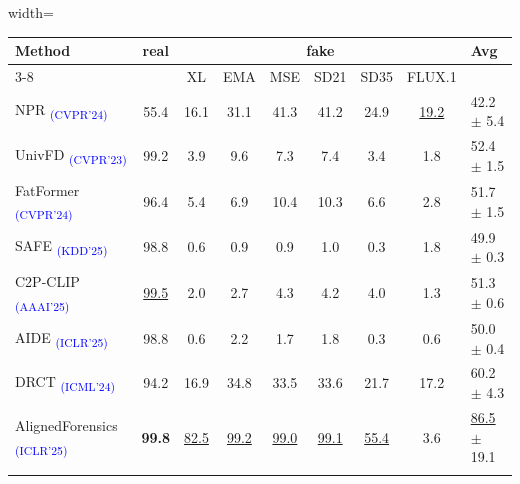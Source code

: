 \documentclass{article}
\begin{document}
\begin{table}[tb!]
  \centering
\begin{minipage}[t]{0.51\textwidth}
    \centering
    \label{tab:compare-DDA-coco}
    \begin{adjustbox}{width=\linewidth}
    \begin{tabular}{lc|cccccc|l}
    \toprule
    \multirow{2}{*}{Method} & \multirow{2}{*}{real} & \multicolumn{6}{|c|}{fake} & \multirow{2}{*}{Avg} \\
    \cmidrule{3-8}
 &  & XL & EMA & MSE & SD21 & SD35 & FLUX.1 & \\
    \midrule
NPR \textsubscript{\textcolor{blue}{(CVPR'24)}} \cite{cozzolino2024zero} & 55.4 & 16.1 & 31.1 & 41.3 & 41.2 & 24.9 & \underline{19.2} & 42.2 $\pm$ 5.4 \\
UnivFD \textsubscript{\textcolor{blue}{(CVPR'23)}} \cite{ojha2023towards} & 99.2 & 3.9 & 9.6 & 7.3 & 7.4 & 3.4 & 1.8 & 52.4 $\pm$ 1.5 \\
FatFormer \textsubscript{\textcolor{blue}{(CVPR'24)}} \cite{liu2024forgery} & 96.4 & 5.4 & 6.9 & 10.4 & 10.3 & 6.6 & 2.8 & 51.7 $\pm$ 1.5 \\
SAFE \textsubscript{\textcolor{blue}{(KDD'25)}} \cite{li2024improving} & 98.8 & 0.6 & 0.9 & 0.9 & 1.0 & 0.3 & 1.8 & 49.9 $\pm$ 0.3 \\
C2P-CLIP \textsubscript{\textcolor{blue}{(AAAI'25)}} \cite{tan2024c2p} & \underline{99.5} & 2.0 & 2.7 & 4.3 & 4.2 & 4.0 & 1.3 & 51.3 $\pm$ 0.6 \\
AIDE \textsubscript{\textcolor{blue}{(ICLR'25)}} \cite{yan2024sanity} & 98.8 & 0.6 & 2.2 & 1.7 & 1.8 & 0.3 & 0.6 & 50.0 $\pm$ 0.4 \\
DRCT \textsubscript{\textcolor{blue}{(ICML'24)}} \cite{chen2024drct} & 94.2 & 16.9 & 34.8 & 33.5 & 33.6 & 21.7 & 17.2 & 60.2 $\pm$ 4.3 \\
AlignedForensics \textsubscript{\textcolor{blue}{(ICLR'25)}} \cite{rajan2025aligned} & \textbf{99.8} & \underline{82.5} & \underline{99.2} & \underline{99.0} & \underline{99.1} & \underline{55.4} & 3.6 & \underline{86.5} $\pm$ 19.1 \\
    \midrule
    \rowcolor{myblue}
    \rowcolor{myblue}

\end{tabular}
\end{adjustbox}
\end{minipage}
\end{table}
\end{document}
